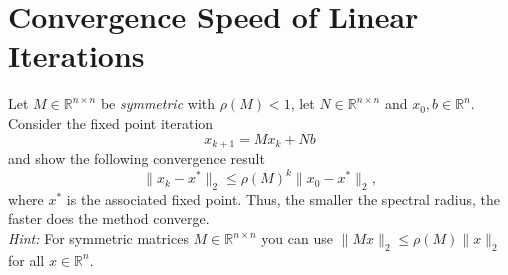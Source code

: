 \section{Convergence Speed of Linear Iterations}
Let $M \in \mathbb{R}^{n \times n}$ be \textit{symmetric} with $\rho(M) < 1$, let $N \in \mathbb{R}^{n \times n}$ and $x_0, b \in \mathbb{R}^n$. 
Consider the fixed point iteration 
$$
x_{k+1} = Mx_k + Nb 
$$ 
and show the following convergence result 
$$
\|x_k - x^*\|_2  \leq \rho(M)^k \|x_0 - x^*\|_2  ,
$$
where $x^*$ is the associated fixed point.
Thus, the smaller the spectral radius, the faster does the method converge.\\
[0.1cm]
\textit{Hint:} For symmetric matrices $M\in \mathbb{R}^{n \times n}$ you can use $\|Mx\|_2 \leq \rho(M) \|x\|_2$ for all $x\in \mathbb{R}^n$.	


